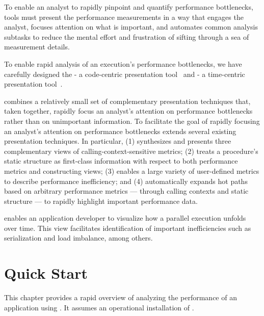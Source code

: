 \documentclass[11pt,letterpaper]{report}
\begin{document}
To enable an analyst to rapidly pinpoint and quantify performance bottlenecks, tools must present the performance measurements in a way that engages the analyst, focuses attention on what is important, and automates common analysis subtasks to reduce the mental effort and frustration of sifting through a sea of measurement details.

To enable rapid analysis of an execution's performance bottlenecks, we have carefully designed the \hpcviewer{} - a code-centric presentation tool~\cite{Adhianto-MC-Ta:2010:PSTI-hpcviewer} and \hpctraceviewer{} - a time-centric presentation tool~\cite{Tallent-MC-etal:2011:ICS-hpctoolkit-scalable-tracing}. 

\hpcviewer{} combines a relatively small set of complementary presentation techniques that, taken together, rapidly focus an analyst's attention on performance bottlenecks rather than on unimportant information.
To facilitate the goal of rapidly focusing an analyst's attention on performance bottlenecks \hpcviewer{} extends several existing presentation techniques.
In particular, \hpcviewer{} (1) synthesizes and presents three complementary views of calling-context-sensitive metrics; (2) treats a procedure's static structure as first-class information with respect to both performance metrics and constructing views; (3) enables a large variety of user-defined metrics to describe performance inefficiency; and (4) automatically expands hot paths based on arbitrary performance metrics --- through calling contexts and static structure --- to rapidly highlight important performance data.

\hpctraceviewer{}  enables an application developer to visualize how a parallel execution unfolds over time. This view facilitates identification of important inefficiencies such as serialization and load imbalance, among others.




\chapter{Quick Start}
\label{chpt:quickstart}

This chapter provides a rapid overview of analyzing the performance of an application using \HPCToolkit{}.
It assumes an operational installation of \HPCToolkit{}.
\end{document}
